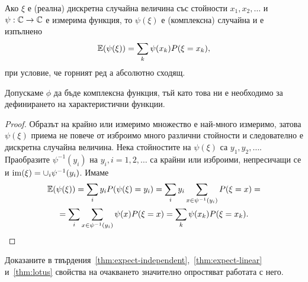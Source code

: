 \documentclass[numbers=endperiod, DIV=15, bibliography=totocnumbered]{scrartcl}
\begin{document}
\begin{proposition}\label{thm:lotus}
  Ако $\xi$ е (реална) дискретна случайна величина със стойности $x_1, x_2, \ldots$ и $\psi: \mathbb{C} \to \mathbb{C}$ е измерима функция, то $\psi(\xi)$ е (комплексна) случайна и е изпълнено
  \begin{displaymath}
    \mathbb{E}(\psi(\xi))
    =
    \sum_k \psi(x_k) P(\xi = x_k),
  \end{displaymath}
  при условие, че горният ред а абсолютно сходящ.
\end{proposition}

\begin{note}
  Допускаме $\phi$ да бъде комплексна функция, тъй като това ни е необходимо за дефинирането на характеристични функции.
\end{note}

\begin{proof}
  Образът на крайно или измеримо множество е най-много измеримо, затова $\psi(\xi)$ приема не повече от изброимо много различни стойности и следователно е дискретна случайна величина. Нека стойностите на $\psi(\xi)$ са $y_1, y_2, \ldots$. Праобразите $\psi^{-1}(y_i)$ на $y_i, i = 1, 2, \ldots$ са крайни или изброими, непресичащи се и $\operatorname{im}(\xi) = \cup_i \psi^{-1}(y_i)$. Имаме
  \begin{multline*}
    \mathbb{E}(\psi(\xi))
    =
    \sum_i y_i P(\psi(\xi) = y_i)
    =
    \sum_i y_i \sum_{x \in \psi^{-1}(y_i)} P(\xi = x)
    = \\ =
    \sum_i \sum_{x \in \psi^{-1}(y_i)} \psi(x) P(\xi = x)
    =
    \sum_k \psi(x_k) P(\xi = x_k).
  \end{multline*}
\end{proof}

Доказаните в твърдения~\ref{thm:expect-independent},~\ref{thm:expect-linear} и~\ref{thm:lotus} свойства на очакването значително опростяват работата с него.
\end{document}
